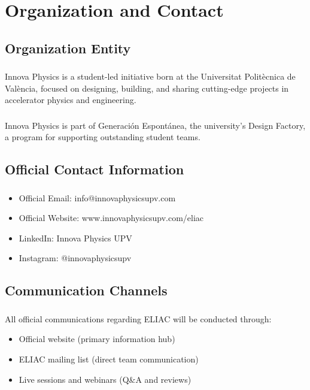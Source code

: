 
\renewcommand{\thesection}{O}
\section{Organization and Contact}

\subsection{Organization Entity}

\subsubsection{}
Innova Physics is a student-led initiative born at the Universitat Politècnica de València, focused on designing, building, and sharing cutting-edge projects in accelerator physics and engineering.

\subsubsection{}
Innova Physics is part of Generación Espontánea, the university's Design Factory, a program for supporting outstanding student teams.

\subsection{Official Contact Information}

\subsubsection{}
\begin{itemize}[noitemsep]
    \item Official Email: info@innovaphysicsupv.com
    \item Official Website: www.innovaphysicsupv.com/eliac
    \item LinkedIn: Innova Physics UPV
    \item Instagram: @innovaphysicsupv
\end{itemize}

\subsection{Communication Channels}

\subsubsection{}
All official communications regarding ELIAC will be conducted through:
\begin{itemize}[noitemsep]
    \item Official website (primary information hub)
    \item ELIAC mailing list (direct team communication)
    \item Live sessions and webinars (Q\&A and reviews)
\end{itemize}

